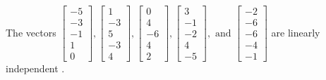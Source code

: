\begin{exercise}
\begin{exerciseStatement}
  \end{exerciseStatement}
  \begin{exerciseAnswer}
   The vectors \(\left[\begin{array}{r}
-5 \\
-3 \\
-1 \\
1 \\
0
\end{array}\right] , \left[\begin{array}{r}
1 \\
-3 \\
5 \\
-3 \\
4
\end{array}\right] , \left[\begin{array}{r}
0 \\
4 \\
-6 \\
4 \\
2
\end{array}\right] , \left[\begin{array}{r}
3 \\
-1 \\
-2 \\
4 \\
-5
\end{array}\right] , \text{ and } \left[\begin{array}{r}
-2 \\
-6 \\
-6 \\
-4 \\
-1
\end{array}\right]\) are 
  	 linearly independent  .
  


  \end{exerciseAnswer}
\end{exercise}